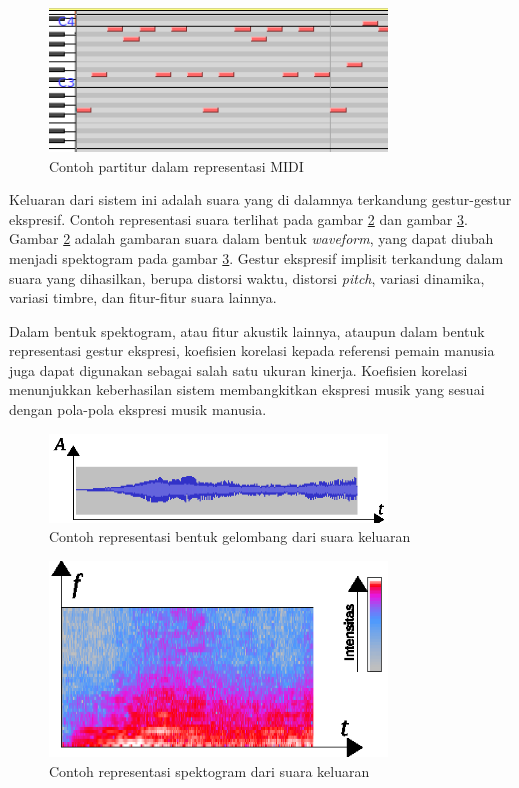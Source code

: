 \begin{figure}[h]
    \centering
    \includegraphics[width=0.8\textwidth]{resources/sheet-example-midi.png}
    \caption{Contoh partitur dalam representasi MIDI} \label{midimusicsheet}
\end{figure}

Keluaran dari sistem ini adalah suara yang di dalamnya terkandung gestur-gestur ekspresif. Contoh representasi suara terlihat pada gambar \ref{waveformexample} dan gambar \ref{spectogramexample}. Gambar \ref{waveformexample} adalah gambaran suara dalam bentuk \textit{waveform}, yang dapat diubah menjadi spektogram pada gambar \ref{spectogramexample}. Gestur ekspresif implisit terkandung dalam suara yang dihasilkan, berupa distorsi waktu, distorsi \textit{pitch}, variasi dinamika, variasi timbre, dan fitur-fitur suara lainnya.

Dalam bentuk spektogram, atau fitur akustik lainnya, ataupun dalam bentuk representasi gestur ekspresi, koefisien korelasi kepada referensi pemain manusia juga dapat digunakan sebagai salah satu ukuran kinerja. Koefisien korelasi menunjukkan keberhasilan sistem membangkitkan ekspresi musik yang sesuai dengan pola-pola ekspresi musik manusia. \parencite{schubert2017test} \parencite{lindemann2007rpm}

\begin{figure}[h]
    \centering
    \includegraphics[width=0.8\textwidth]{resources/waveform-example.eps}
    \caption{Contoh representasi bentuk gelombang dari suara keluaran} \label{waveformexample}
\end{figure}

\begin{figure}[h]
    \centering
    \includegraphics[width=0.8\textwidth]{resources/spectogram-example.eps}
    \caption{Contoh representasi spektogram dari suara keluaran} \label{spectogramexample}
\end{figure}

